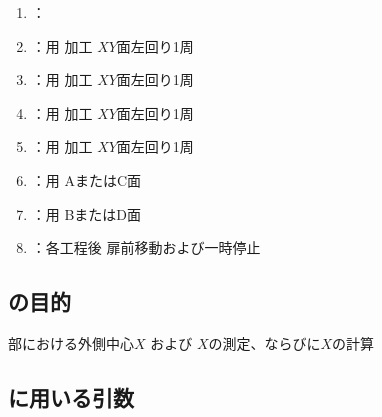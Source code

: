\begin{enumerate}[label*=\sarrow]
\item \KIncutBoring：\IncutBoringMilling
\item \KOLeftFF：\KEndFaceBoring 用 加工 $XY$面左回り1周
\item \KOLeftFS：\KEndFaceRight\KOutcutRLeft\KKeywayConerLeft\KEndFaceOutCChamferRLeft 用 加工 $XY$面左回り1周
\item \KOLeftFSZ：\KCurvedOutcutRLeft\KEndFaceCurvedOutCChamferRLeft 用 加工 $XY$面左回り1周
\item \KILeftFF：\KEndFaceInCChamferRLeft\KIncutBoring 用 加工 $XY$面左回り1周
\item \DKLthreeAC：\DLtwoAC 用 AまたはC面 \DimpleMilling
\item \DKLthreeBD：\DLtwoBD 用 BまたはD面 \DimpleMilling
\item \OpauseCheck：各工程後 扉前移動および一時停止
\end{enumerate}



\clearpage


\subsection{\MXOThickness の目的}
\EndFace 部における外側中心$X$ および \HorizontalOD$X$の測定、ならびに\KeywayCenter$X$の計算


\subsection{\MXOThickness に用いる引数\TBW}


